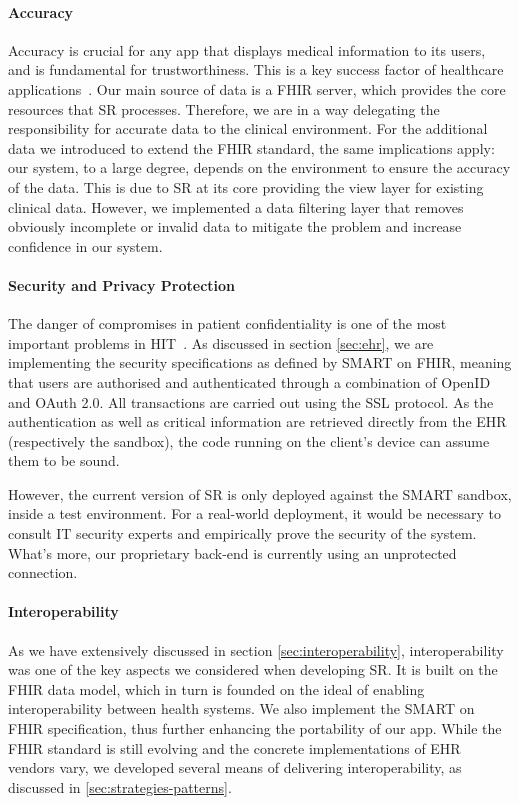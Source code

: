 \documentclass[sigconf]{acmart}
\begin{document}
\paragraph{Accuracy}

Accuracy is crucial for any app that displays medical information to its users, and is fundamental for trustworthiness. This is a key success factor of healthcare applications~\cite{trustworthy-apps}. Our main source of data is a FHIR server, which provides the core resources that SR processes. Therefore, we are in a way delegating the responsibility for accurate data to the clinical environment. For the additional data we introduced to extend the FHIR standard, the same implications apply: our system, to a large degree, depends on the environment to ensure the accuracy of the data. This is due to SR at its core providing the view layer for existing clinical data. However, we implemented a data filtering layer that removes obviously incomplete or invalid data to mitigate the problem and increase confidence in our system.


\paragraph{Security and Privacy Protection}

The danger of compromises in patient confidentiality is one of the most important problems in HIT~\cite{lack-of-evidence}. As discussed in section \ref{sec:ehr}, we are implementing the security specifications as defined by SMART on FHIR, meaning that users are authorised and authenticated through a combination of OpenID and OAuth 2.0. All transactions are carried out using the SSL protocol. As the authentication as well as critical information are retrieved directly from the EHR (respectively the sandbox), the code running on the client's device can assume them to be sound.

However, the current version of SR is only deployed against the SMART sandbox, inside a test environment. For a real-world deployment, it would be necessary to consult IT security experts and empirically prove the security of the system. What's more, our proprietary back-end is currently using an unprotected connection.


\paragraph{Interoperability}

As we have extensively discussed in section \ref{sec:interoperability}, interoperability was one of the key aspects we considered when developing SR. It is built on the FHIR data model, which in turn is founded on the ideal of enabling interoperability between health systems. We also implement the SMART on FHIR specification, thus further enhancing the portability of our app. While the FHIR standard is still evolving and the concrete implementations of EHR vendors vary, we developed several means of delivering interoperability, as discussed in \ref{sec:strategies-patterns}.
\end{document}
